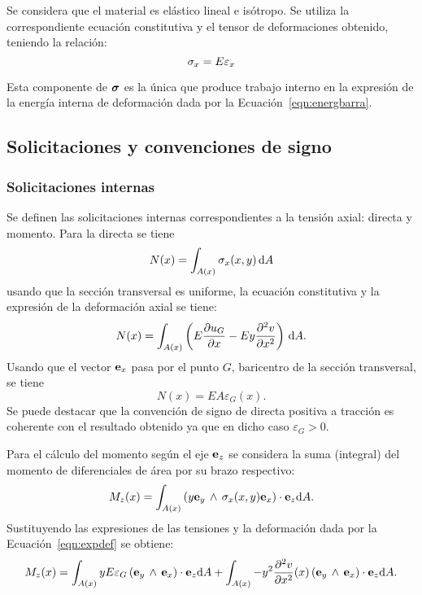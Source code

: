 Se considera que el material es elástico lineal e isótropo. Se utiliza la correspondiente ecuación constitutiva y el tensor de deformaciones obtenido, teniendo la relación:
%
\begin{equation}
  \sigma_x = E \varepsilon_x
\end{equation}

Esta componente de $\boldsymbol{\sigma}$ es la única que produce trabajo interno en la expresión de la energía interna de deformación dada por la Ecuación~\eqref{eqn:energbarra}.

\subsection{Solicitaciones y convenciones de signo}


\subsubsection{Solicitaciones internas}

Se definen las solicitaciones internas correspondientes a la tensión axial: directa y momento. %
%
Para la directa se tiene
%
\begin{equation}
N (x) = \int_{A(x)} \sigma_x (x,y) \, {\text{d}} A
\end{equation}
%
usando que la sección transversal es uniforme, la ecuación constitutiva y la expresión de la deformación axial se tiene:
%
\begin{equation}
N (x) = \int_{A(x)} \left( E \frac{\partial u_G}{\partial x} - E y \frac{\partial^2 v}{\partial x^2}   \right) \, {\text{d}} A.
\end{equation}
%
Usando que el vector ${\bf e}_x$ pasa por el punto $G$, baricentro de la sección transversal, se tiene
%
\begin{equation}\label{eqn:direc}
\boxed{
N (x) =  E A  \varepsilon_G(x).
}
\end{equation}
%
Se puede destacar que la convención de signo de directa positiva a tracción es coherente con el resultado obtenido ya que en dicho caso $\varepsilon_G >0$.

Para el cálculo del momento según el eje ${\bf e}_z$ se considera la suma (integral) del momento de diferenciales de área por su brazo respectivo:
%
\begin{equation}
M_z (x) = \int_{A(x)} \left( y {\bf e}_y \,  \wedge \, \sigma_x (x,y) {\bf e}_x \right) \cdot {\bf e}_z {\text{d}} A.
\end{equation}
%
Sustituyendo las expresiones de las tensiones y la deformación dada por la Ecuación~\eqref{eqn:expdef} se obtiene:
%
\begin{equation}
M_z (x) = \int_{A(x)} y E \varepsilon_{G} \left( {\bf e}_y \,  \wedge \, {\bf e}_x \right) \cdot {\bf e}_z {\text{d}} A + \int_{A(x)} -y^2 \frac{\partial^2 v}{\partial x^2} (x)  \left( {\bf e}_y \,  \wedge \, {\bf e}_x \right) \cdot {\bf e}_z {\text{d}} A.
\end{equation}

